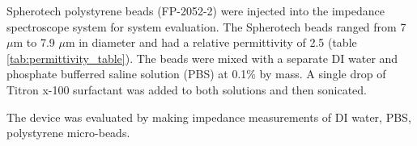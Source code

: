 \par Spherotech polystyrene beads (FP-2052-2) were injected into the impedance spectroscope system for system evaluation. The Spherotech beads ranged from 7 $\mu$m to 7.9 $\mu$m in diameter and had a relative permittivity of 2.5 (table \ref{tab:permittivity_table}). The beads were mixed with a separate DI water and phosphate bufferred saline solution (PBS) at 0.1\% by mass. A single drop of Titron x-100 surfactant was added to both solutions and then sonicated.

\par The device was evaluated by making impedance measurements of DI water, PBS, polystyrene micro-beads. 

